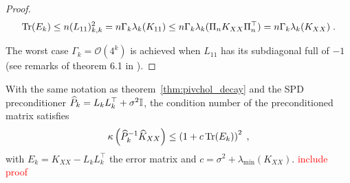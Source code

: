\documentclass{article}
\begin{document}
{\begin{proof}
\begin{equation*}
    \operatorname{Tr}(E_k) \le n (L_{11})_{k, k}^2 = n \Gamma_k \lambda_k(K_{11}) \le n \Gamma_k \lambda_k(\Pi_n K_{XX} \Pi_n^\top) = n \Gamma_k \lambda_k(K_{XX}) \; .
\end{equation*}

The worst case $\Gamma_k = \mathcal O(4^k)$ is achieved when $L_{11}$ has its subdiagonal full of $-1$ (see remarks of theorem 6.1 in \cite{higham_survey_1987}).
\end{proof}

\begin{lemma} \label{thm:pivchol_condnum}
With the same notation as theorem~\ref{thm:pivchol_decay} and the SPD preconditioner $\widehat P_k = L_kL_k^\top + \sigma^2 \Id$, the condition number of the preconditioned matrix satisfies
\begin{equation*}
    \kappa \left( \widehat P_k^{-1} \widehat K_{XX} \right)  \le \left( 1 + c \operatorname{Tr}(E_k) \right)^2 \;,
\end{equation*}
with $E_k = K_{XX} - L_kL_k^\top$ the error matrix and $c= \sigma^2 + \lambda_{\min}(K_{XX})$. \textcolor{red}{include proof}
\end{lemma}

}
\end{document}
